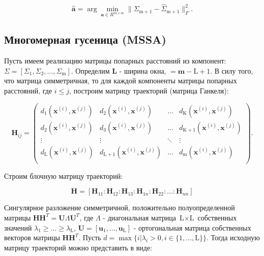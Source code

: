\documentclass{article}
\begin{document}
\begin{equation}
    \hat{\mathbf{a}} = \arg\min\limits_{\mathbf{a} \in R^{m \times m}}\|\Sigma_{\text{m} + 1} - \hat{\Sigma}_{\text{m} + 1}\|_F^2.
\end{equation}

\subsection{Многомерная гусеница (MSSA)}

Пусть имеем реализацию матрицы попарных расстояний из  компонент: $\Sigma = [\Sigma_1, \Sigma_2, \ldots, \Sigma_\text{m}]$. Определим \textbf{L} - ширина окна,  $ = \textbf{m} - \text{L} + 1$. В силу того, что матрица симметричная, то для каждой компоненты матрицы попарных расстояний, где $i \leqslant j$, построим матрицу траекторий (матрица Ганкеля):

\begin{equation}
    \mathbf{H}_{ij} = \left(
\begin{array}{cccc}
d_1(\mathbf{x}^{(i)}, \mathbf{x}^{(j)}) & d_2(\mathbf{x}^{(i)}, \mathbf{x}^{(j)}) & \ldots & d_{\text{K}}(\mathbf{x}^{(i)}, \mathbf{x}^{(j)})\\
d_2(\mathbf{x}^{(i)}, \mathbf{x}^{(j)}) & d_3(\mathbf{x}^{(i)}, \mathbf{x}^{(j)}) & \ldots & d_{\text{K} + 1}(\mathbf{x}^{(i)}, \mathbf{x}^{(j)})\\
\vdots & \vdots & \ddots & \vdots\\
d_{\text{L}}(\mathbf{x}^{(i)}, \mathbf{x}^{(j)}) & d_{\text{L} + 1}(\mathbf{x}^{(i)}, \mathbf{x}^{(j)}) & \ldots & d_\text{m}(\mathbf{x}^{(i)}, \mathbf{x}^{(j)})\\
\end{array}
\right).
\end{equation}

Строим блочную матрицу траекторий:

\begin{equation}
    \mathbf{H} = [\mathbf{H}_{11} : \mathbf{H}_{12} : \mathbf{H}_{13} : \mathbf{H}_{1n} : \mathbf{H}_{22} : \ldots : \mathbf{H}_{nn}]
\end{equation}

Сингулярное разложение симметричной, положительно полуопределенной матрицы $\mathbf{H}\mathbf{H}^T = \mathbf{U}\Lambda\mathbf{U}^T$, где $\Lambda$ - диагональная матрица $\text{L} \times \text{L}$ собственных значений $\lambda_1 \geq \ldots \geq \lambda_{\text{L}}$, $\mathbf{U} = [\mathbf{u}_1, \ldots, \mathbf{u}_{\text{L}}]$ - ортогональная матрица собственных векторов матрицы $\mathbf{H}\mathbf{H}^T$. Пусть $d = \max\{i|\lambda_i > 0, i \in \{1, \ldots, \text{L}\}\}$. Тогда исходную матрицу траекторий можно представить в виде:
\end{document}
